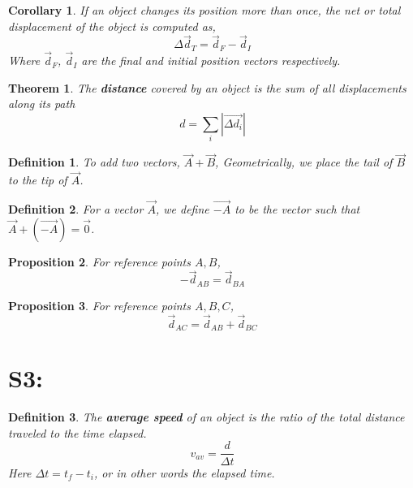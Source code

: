 \documentclass[12pt]{article}
\theoremstyle{break}
\newtheorem*{thm}{Theorem}[subsection]
\newtheorem*{cor}{Corollary}[thm]
\newtheorem*{defn}{Definition}[subsection]
\newtheorem*{prop}[thm]{Proposition}
\begin{document}
\begin{cor}
    If an object changes its position more than once, the \emph{net} or \emph{total}  displacement of the
    object is computed as, $$\Delta \vec d_T = \vec d_F - \vec d_I$$
    Where $\vec d_F$, $\vec d_I$ are the final and initial position vectors respectively.
\end{cor}


\begin{thm}
	The \textbf{distance} covered by an object is the sum of all displacements along its path
	$$ d = \sum_i |\overrightarrow{\Delta d_i}|$$
\end{thm}

\begin{defn}
		To add two vectors, $\vec A + \vec B$, \emph{Geometrically}, we place the \emph{tail} of $\vec B$ to the
		\emph{tip} of $\vec A$.
\end{defn}	

\begin{defn}
    For a vector $\vec A$, we define $\overrightarrow {-A}$ to be the vector such that $\vec A +
    (\overrightarrow{-A}) = \vec 0$.
\end{defn}

\begin{prop}
	For reference points $A,B$,
$$-\vec d_{AB} = \vec d_{BA}$$
\end{prop}

\begin{prop}
	For reference points $A,B,C$, $$\vec d_{AC} = \vec d_{AB} + \vec d_{BC}$$ 
 \end{prop}





\section{S3:}

\begin{defn}
The \textbf{average speed} of an object is the ratio of the total distance traveled to the time elapsed. 
$$v_{av} = \frac{d}{\Delta t}$$
Here $\Delta t = t_f - t_i$, or in other words the elapsed time.
\end{defn}
\end{document}

